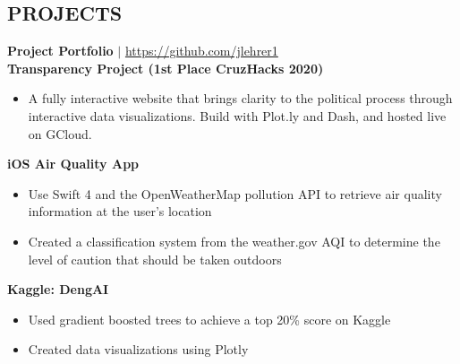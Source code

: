 \documentclass[margin]{res}
\begin{document}
\begin{resume}
\section{PROJECTS}
    \textbf{Project Portfolio} $\mid$ \textcolor{blue}{\href{https://github.com/jlehrer1}{https://github.com/jlehrer1}} \vspace {2mm} \\
    \textbf{Transparency Project (1st Place CruzHacks 2020)}
    \begin{itemize}
        \item A fully interactive website that brings clarity to the political process through interactive data visualizations. Build with Plot.ly and Dash, and hosted live on GCloud.
    \end{itemize}\vspace*{-8pt}
    \textbf{iOS Air Quality App}
    \begin{itemize}
        \item Use Swift 4 and the OpenWeatherMap pollution API to retrieve air quality information at the user's location
        \item Created a classification system from the weather.gov AQI to determine the level of caution that should be taken outdoors
    \end{itemize}\vspace*{-8pt}
    \textbf{Kaggle: DengAI}
    \begin{itemize}
        \item Used gradient boosted trees to achieve a top 20\% score on Kaggle
        \item Created data visualizations using Plotly
    \end{itemize}\vspace*{-8pt}




\end{resume}
\end{document}
